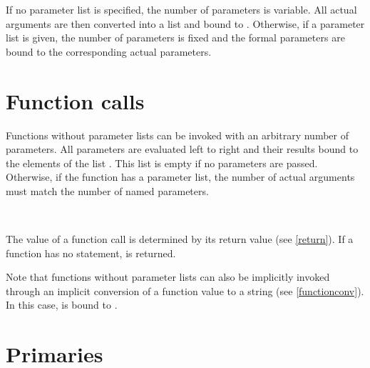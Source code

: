 If no parameter list is specified, the number of parameters
is variable. All actual arguments are then converted into
a list and bound to . Otherwise, if a parameter
list is given, the number of parameters is fixed and the
formal parameters are bound to the corresponding actual
parameters.

\section{Function calls}\label{call}

Functions without parameter lists can be invoked with an
arbitrary number of parameters.
All parameters are evaluated left to right and their results
bound to the elements of the list . This list is
empty if no parameters are passed. Otherwise, if the function
has a parameter list, the number of actual arguments must
match the number of named parameters.

\begin{grammar}
      \produces {} \lextoken{(} \lextoken{)} \\
      \produces {}
         \lextoken{(}  \lextoken{)}
\end{grammar}

\noindent
The value of a function call is determined by its return value
(see \ref{return}). If a function has no 
statement,  is returned.

Note that functions without parameter lists can also be implicitly
invoked through an implicit conversion of a function value to a string
(see \ref{functionconv}). In this case,  is bound to
.

\section{Primaries}

